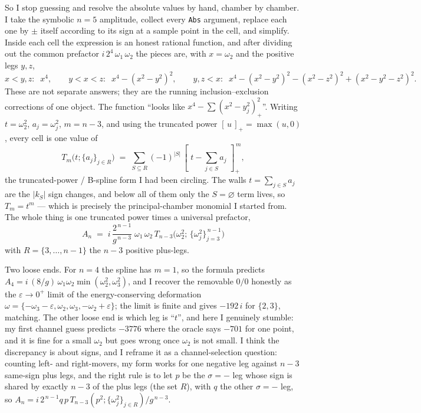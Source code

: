 \documentclass{article}
\newcommand{\pp}[1]{\left[\,#1\,\right]_{+}}
\begin{document}
So I stop guessing and resolve the absolute values by hand, chamber by chamber. I
take the symbolic $n=5$ amplitude, collect every \texttt{Abs} argument, replace
each one by $\pm$ itself according to its sign at a sample point in the cell, and
simplify. Inside each cell the expression is an honest rational function, and
after dividing out the common prefactor $i\,2^{4}\,\omega_1\,\omega_2$ the pieces
are, with $x=\omega_2$ and the positive legs $y,z$,
\[
x<y,z:\;\; x^{4},\qquad
y<x<z:\;\; x^4-(x^2-y^2)^2,\qquad
y,z<x:\;\; x^4-(x^2-y^2)^2-(x^2-z^2)^2+(x^2-y^2-z^2)^2 .
\]
These are not separate answers; they are the running inclusion--exclusion
corrections of one object. The function ``looks like $x^4-\sum(x^2-y_j^2)_+^2$''.
Writing $t=\omega_2^2$, $a_j=\omega_j^2$, $m=n-3$, and using the truncated power
$\pp{u}=\max(u,0)$, every cell is one value of
\[
T_m\big(t;\{a_j\}_{j\in R}\big)\;=\;\sum_{S\subseteq R}(-1)^{|S|}\,
\pp{\,t-\sum_{j\in S}a_j\,}^{\,m},
\]
the truncated-power / B-spline form I had been circling. The walls
$t=\sum_{j\in S}a_j$ are the $|k_S|$ sign changes, and below all of them only the
$S=\varnothing$ term lives, so $T_m=t^m$ --- which is precisely the principal-chamber
monomial I started from. The whole thing is one truncated power times a universal
prefactor,
\[
\boxed{\;
A_n \;=\; i\,\frac{2^{\,n-1}}{g^{\,n-3}}\;\omega_1\,\omega_2\,
T_{n-3}\!\Big(\omega_2^2;\,\{\omega_j^2\}_{j=3}^{\,n-1}\Big)\;}
\]
with $R=\{3,\dots,n-1\}$ the $n-3$ positive plus-legs.

Two loose ends. For $n=4$ the spline has $m=1$, so the formula predicts
$A_4=i\,(8/g)\,\omega_1\omega_2\min(\omega_2^2,\omega_3^2)$, and I recover the
removable $0/0$ honestly as the $\varepsilon\to0^+$ limit of the
energy-conserving deformation
$\omega=\{-\omega_3-\varepsilon,\omega_2,\omega_3,-\omega_2+\varepsilon\}$; the
limit is finite and gives $-192\,i$ for $\{2,3\}$, matching. The other loose end
is which leg is ``$t$'', and here I genuinely stumble: my first channel guess
predicts $-3776$ where the oracle says $-701$ for one point, and it is fine for a
small $\omega_2$ but goes wrong once $\omega_2$ is not small. I think the
discrepancy is about signs, and I reframe it as a channel-selection question:
counting left- and right-movers, my form works for one negative leg against
$n-3$ same-sign plus legs, and the right rule is to let $p$ be the $\sigma=-$ leg
whose sign is shared by exactly $n-3$ of the plus legs (the set $R$), with $q$ the
other $\sigma=-$ leg, so
$A_n=i\,2^{\,n-1}q\,p\,T_{n-3}(p^2;\{\omega_j^2\}_{j\in R})/g^{\,n-3}$.
\end{document}

